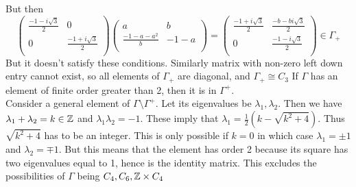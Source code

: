 \documentclass[a4paper]{article}
\begin{document}
But then 
$$\begin{pmatrix}
\frac{-1-i\sqrt{3}}{2} & 0 \\ 
0 &  \frac{-1+i\sqrt{3}}{2}\\
\end{pmatrix} \begin{pmatrix}
a & b \\ 
\frac{-1-a-a^2}{b} & -1-a \\
\end{pmatrix} = \begin{pmatrix}
\frac{-1+i\sqrt{3}}{2} & \frac{-b-b i\sqrt{3}}{2} \\ 
0 & \frac{-1-i\sqrt{3}}{2} \\
\end{pmatrix} \in \Gamma_+$$
But it doesn't satisfy these conditions.
Similarly matrix with non-zero left down entry cannot exist, so all elements of $\Gamma_+$ are diagonal, and $\Gamma_+ \cong C_3$
\clm If $\Gamma$ has an element of finite order greater than 2, then it is in $\Gamma^{+}$.\\
Consider a general element of $\Gamma \setminus \Gamma^{+}$. Let its eigenvalues be $\lambda_1,\lambda_2$. Then we have  $\lambda_1+\lambda_2=k\in \mathbb{Z}$ and $\lambda_1\lambda_2=-1$. These imply that $\lambda_1=\frac{1}{2}\left( k-\sqrt{k^2+4}  \right) $. Thus $\sqrt{k^2+4} $ has to be an integer. This is only possible if $k=0$ in which case  $\lambda_1=\pm 1$ and $\lambda_2=\mp 1$. But this means that the element has order 2 because its square has two eigenvalues equal to 1, hence is the identity matrix. This excludes the possibilities of $\Gamma$ being $C_4,C_6,\mathbb{Z}\times C_4$

\\
 
\end{document}

